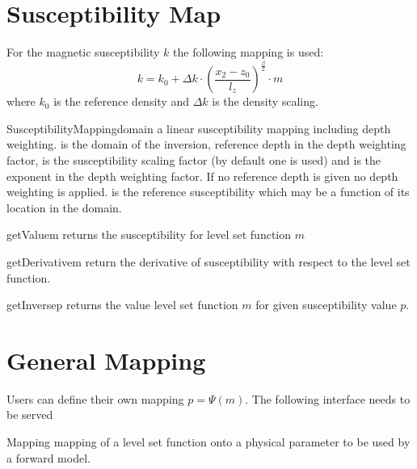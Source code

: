 \section{Susceptibility Map}
For the magnetic susceptibility $k$ the following mapping is used:
\begin{equation}\label{EQU:MAP:2}
k=  k_{0} + \Delta k \cdot \left( \frac{x_2 - z_0}{l_z} \right)^{\frac{\beta}{2}}  \cdot m 
\end{equation}  
where $k_{0}$ is the reference density and $\Delta k$ is the density scaling.

\begin{classdesc}{SusceptibilityMapping}{domain
        }
a linear susceptibility mapping including depth weighting.
 is the domain of the inversion,  reference depth in
the depth weighting factor,  is the susceptibility scaling factor
(by default one is used) and  is the exponent in the depth
weighting factor. If no reference depth  is given no depth
weighting is applied.
 is the reference susceptibility which may be a function of its
location in the domain. 
\end{classdesc}

\begin{methoddesc}[SusceptibilityMapping]{getValue}{m}
returns the susceptibility for level set function $m$
\end{methoddesc}

\begin{methoddesc}[SusceptibilityMapping]{getDerivative}{m}
return the derivative of susceptibility  with respect to the level set function.
\end{methoddesc}  

\begin{methoddesc}[SusceptibilityMapping]{getInverse}{p}
returns the value level set function $m$ for given susceptibility value $p$.
\end{methoddesc}


\section{General Mapping}
Users can define their own mapping $p=\Psi(m)$.
The following interface needs to be served

\begin{classdesc}{Mapping}{}
mapping of a level set function onto a physical parameter to be used by a
forward model.
\end{classdesc} 

